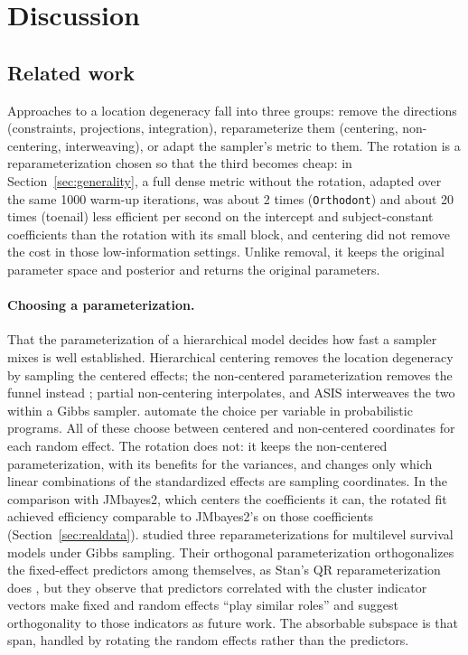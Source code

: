 \section{Discussion}\label{sec:discussion}

\subsection{Related work}\label{sec:related}

Approaches to a location degeneracy fall into three groups: remove the
directions (constraints, projections, integration), reparameterize them
(centering, non-centering, interweaving), or adapt the sampler's metric to
them. The rotation is a reparameterization chosen so that the third
becomes cheap: in Section~\ref{sec:generality}, a full dense metric without
the rotation, adapted over the same 1000 warm-up iterations, was about 2 times (\texttt{Orthodont}) and about 20 times (toenail) less efficient per second on the intercept and subject-constant coefficients than the rotation with its small block, and
centering did not remove the cost in those low-information settings. Unlike removal, it keeps the original parameter space and
posterior and returns the original parameters.


\paragraph{Choosing a parameterization.} That the parameterization of a
hierarchical model decides how fast a sampler mixes is well established.
Hierarchical centering \citep{gelfand1995,gelfand1996} removes the location
degeneracy by sampling the centered effects; the non-centered
parameterization removes the funnel instead
\citep{papaspiliopoulos2003,papaspiliopoulos2007}; partial non-centering
interpolates, and ASIS \citep{yu2011} interweaves the two within a Gibbs
sampler. \citet{gorinova2020} automate the choice per variable in
probabilistic programs. All of these choose between centered and
non-centered coordinates for each random effect. The rotation does not: it
keeps the non-centered parameterization, with its benefits for the
variances, and changes only which linear combinations of the standardized
effects are sampling coordinates. In the comparison with JMbayes2, which centers the coefficients it can, the rotated fit achieved efficiency comparable to JMbayes2's on those coefficients (Section~\ref{sec:realdata}). \citet{browne2009}
studied three reparameterizations for multilevel survival models under
Gibbs sampling. Their orthogonal parameterization orthogonalizes the
fixed-effect predictors among themselves, as Stan's QR reparameterization
does \citep{stanug}, but they observe that predictors correlated with the
cluster indicator vectors make fixed and random effects ``play similar
roles'' and suggest orthogonality to those indicators as future work. The
absorbable subspace is that span, handled by rotating the random effects
rather than the predictors.

